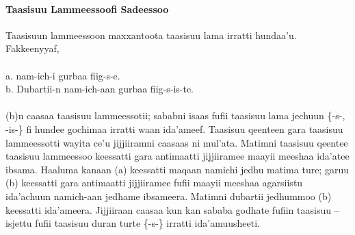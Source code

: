 \documentclass[11pt,b5paper]{book}
\begin{document}
\paragraph{Taasisuu Lammeessoofi Sadeessoo }
Taasisuun lammeessoon maxxantoota taasisuu lama irratti hundaa’u. Fakkeenyyaf, \\
\\
a. nam-ich-i gurbaa fiig-s-e.\\
b. Dubartii-n nam-ich-aan gurbaa fiig-s-is-te.\\
\\
(b)n caasaa taasisuu lammeessotii; sababni isaas fufii taasisuu lama jechuun \{-s-, -is-\} fi hundee gochimaa irratti waan ida’ameef. Taasisuu qeenteen gara taasisuu lammeessotti wayita ce’u jijjiiramni caasaas ni mul’ata. Matimni taasisuu qeentee taasisuu lammeessoo keessatti gara antimaatti
jijjiiramee maayii meeshaa ida’atee ibsama. Haaluma kanaan (a) keessatti maqaan namichi jedhu matima ture; garuu (b) keessatti gara antimaatti jijjiiramee fufii maayii meeshaa agarsiistu ida’achuun namich-aan jedhame ibsameera. Matimni dubartii jedhummoo (b) keessatti ida’ameera.
Jijjiiraan caasaa kun kan sababa godhate fufiin taasisuu –isjettu fufii taasisuu duran turte \{-s-\} irratti ida’amuusheeti.
\end{document}
